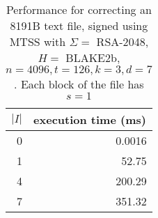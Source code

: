 \begin{table}[ht]
\centering
\begin{tabular}{rr}
\hline
\multicolumn{1}{|l|}{\textbf{$|I|$}} & \multicolumn{1}{l|}{\textbf{execution time (ms)}} \\ \hline
0                                  & 0.0016                                            \\
1                                  & 52.75                                             \\
4                                  & 200.29                                            \\
7                                  & 351.32                                           
\end{tabular}
    \caption{Performance for correcting an 8191B text file, signed using MTSS with $\Sigma =$ RSA-2048, $H =$ BLAKE2b, $n = 4096, t = 126, k = 3, d = 7$. Each block of the file has $s = 1$}
    \label{table:correction-different-i}
\end{table}